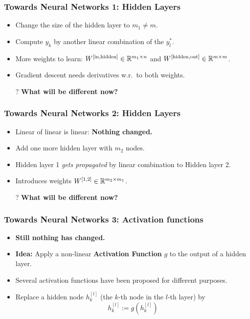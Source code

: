 \documentclass[10pt,hyperref={pdfpagelabels=false}]{beamer}
\begin{document}
\begin{frame}
    \frametitle{Towards Neural Networks 1: Hidden Layers}
    \begin{minipage}{.5\textwidth}
        
    \end{minipage}
    \begin{minipage}{.4\textwidth}
        \begin{itemize}
            \item Change the size of the hidden layer to $m_1\neq m$.
            \item Compute $y_k$ by another linear combination of the $y_l^{\ast}$.
            \item More weights to learn: $W^{[\text{in},\text{hidden}]}\in\mathbb{R}^{m_1\times n}$ and $W^{[\text{hidden}, \text{out}]}\in\mathbb{R}^{m\times m}$.
            \item Gradient descent needs derivatives w.r.~to both weights.
            \item[$\boldsymbol{?}$] {\bf What will be different now?}
        \end{itemize}
    \end{minipage}
\end{frame}
\begin{frame}
    \frametitle{Towards Neural Networks 2: Hidden Layers}
    \begin{itemize}
        \item Linear of linear is linear: {\bf Nothing changed.}
        \item Add one more hidden layer with $m_2$ nodes.
        \item Hidden layer 1 \emph{gets propagated} by linear combination to Hidden layer 2.
        \item Introduces weights $W^{[1,2]}\in \mathbb{R}^{m_2\times m_1}$.
        \item[$\boldsymbol{?}$] {\bf What will be different now?}
    \end{itemize}

    \centering 
\end{frame}
\begin{frame}
    \frametitle{Towards Neural Networks 3: Activation functions}
    \begin{itemize}
        \item {\bf Still nothing has changed.}
        \item {\bf Idea:} Apply a non-linear {\bf Activation Function} $g$ to the output of a hidden layer.
        \item Several activation functions have been proposed for different purposes.
        \item Replace a hidden node $h^{[l]}_{k}$ (the $k$-th node in the $l$-th layer) by
        $$
            h^{[l]}_k := g(h^{[l]}_k)
        $$
    \end{itemize}
    \centering
\end{frame}
\end{document}
